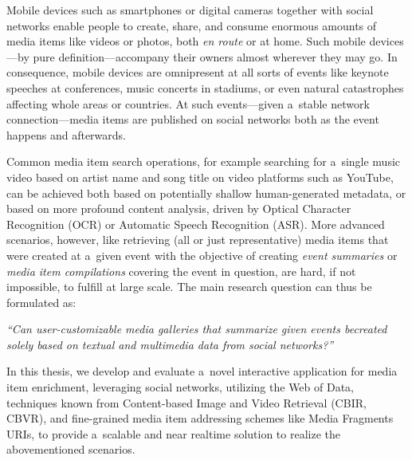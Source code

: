 


\begin{abstracts}        %
Mobile devices such as smartphones or digital cameras together with social networks
enable people to create, share, and consume enormous amounts of media items like videos or photos,
both \textit{en route} or at home.
Such mobile devices---by pure definition---accompany their owners almost wherever they may go.
In consequence, mobile devices are omnipresent at all sorts of events
like keynote speeches at conferences, music concerts in stadiums,
or even natural catastrophes affecting whole areas or countries.
At such events---given a~stable network connection---media items are published
on social networks both as the event happens and afterwards.

Common media item search operations, for example searching for a~single music video
based on artist name and song title on video platforms such as YouTube,
can be achieved both based on potentially shallow human-generated metadata,
or based on more profound content analysis,
driven by Optical Character Recognition (OCR) or Automatic Speech Recognition (ASR).
More advanced scenarios, however, like retrieving (all or just representative) media items
that were created at a~given event with the objective of creating \emph{event summaries} or
\emph{media item compilations} covering the event in question, are hard,
if not impossible, to fulfill at large scale.
The main research question can thus be formulated as:

\textit{``Can user-customizable media galleries that summarize given events
be\linebreak created solely based on textual and multimedia data from social networks?''}

In this thesis, we develop and evaluate a~novel interactive application
for media item enrichment, leveraging social networks, utilizing the Web of Data,
techniques known from Content-based Image and Video Retrieval (CBIR, CBVR),
and fine-grained media item addressing schemes like Media Fragments URIs,
to provide a~scalable and near realtime solution to realize the abovementioned scenarios.


\end{abstracts}
